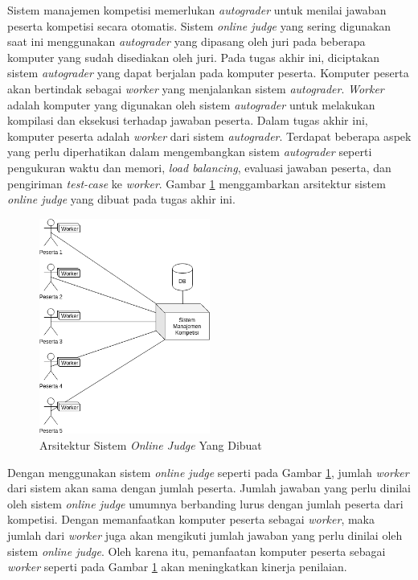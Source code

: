 \par Sistem manajemen kompetisi memerlukan \textit{autograder} untuk menilai jawaban peserta kompetisi secara otomatis. Sistem \textit{online judge} yang sering digunakan saat ini menggunakan \textit{autograder} yang dipasang oleh juri pada beberapa komputer yang sudah disediakan oleh juri. Pada tugas akhir ini, diciptakan sistem \textit{autograder} yang dapat berjalan pada komputer peserta. Komputer peserta akan bertindak sebagai \textit{worker} yang menjalankan sistem \textit{autograder}. \textit{Worker} adalah komputer yang digunakan oleh sistem \textit{autograder} untuk melakukan kompilasi dan eksekusi terhadap jawaban peserta. Dalam tugas akhir ini, komputer peserta adalah \textit{worker} dari sistem \textit{autograder}. Terdapat beberapa aspek yang perlu diperhatikan dalam mengembangkan sistem \textit{autograder} seperti pengukuran waktu dan memori, \textit{load balancing}, evaluasi jawaban peserta, dan pengiriman \textit{test-case} ke \textit{worker}. Gambar \ref{fig:architecture-new} menggambarkan arsitektur sistem \textit{online judge} yang dibuat pada tugas akhir ini.

\begin{figure}[ht!]
    \centering
    \includegraphics[width=0.5\textwidth]{images/architecture-new}
    \caption{Arsitektur Sistem \textit{Online Judge} Yang Dibuat}
    \label{fig:architecture-new}
\end{figure}

\par Dengan menggunakan sistem \textit{online judge} seperti pada Gambar \ref{fig:architecture-new}, jumlah \textit{worker} dari sistem akan sama dengan jumlah peserta. Jumlah jawaban yang perlu dinilai oleh sistem \textit{online judge} umumnya berbanding lurus dengan jumlah peserta dari kompetisi. Dengan memanfaatkan komputer peserta sebagai \textit{worker}, maka jumlah dari \textit{worker} juga akan mengikuti jumlah jawaban yang perlu dinilai oleh sistem \textit{online judge}. Oleh karena itu, pemanfaatan komputer peserta sebagai \textit{worker} seperti pada Gambar \ref{fig:architecture-new} akan meningkatkan kinerja penilaian.


